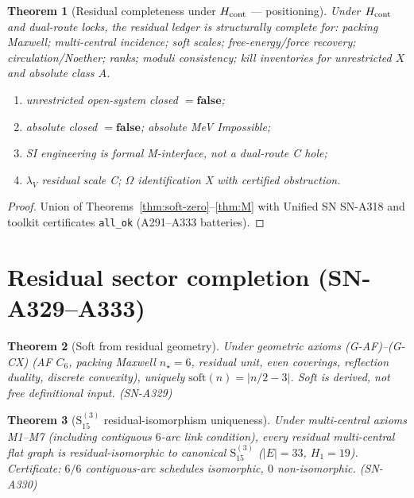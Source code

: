 \documentclass[11pt,a4paper]{article}
\newtheorem{theorem}{Theorem}
\theoremstyle{remark}
\begin{document}
\begin{theorem}[Residual completeness under $H_{\rm cont}$ --- positioning]
\label{thm:positioning}
Under $H_{\rm cont}$ and dual-route locks, the residual ledger is structurally complete for: packing Maxwell; multi-central incidence; soft scales; free-energy/force recovery; circulation/Noether; ranks; moduli consistency; kill inventories for unrestricted $X$ and absolute class $A$.
\begin{enumerate}[label=(\roman*)]
\item unrestricted open-system closed $=\mathbf{false}$;
\item absolute closed $=\mathbf{false}$; absolute MeV Impossible;
\item SI engineering is formal M-interface, not a dual-route C hole;
\item $\lambda_V$ residual scale C; $\Omega$ identification X with certified obstruction.
\end{enumerate}
\end{theorem}

\begin{proof}
Union of Theorems~\ref{thm:soft-zero}--\ref{thm:M} with Unified SN SN-A318 and toolkit certificates \texttt{all\_ok} (A291--A333 batteries).
\end{proof}


\section{Residual sector completion (SN-A329--A333)}
\label{sec:completion-A329}

\begin{theorem}[Soft from residual geometry]
Under geometric axioms (G-AF)--(G-CX) (AF $C_6$, packing Maxwell $n_\star=6$, residual unit, even coverings, reflection duality, discrete convexity), uniquely $\mathrm{soft}(n)=|n/2-3|$. Soft is derived, not free definitional input. (SN-A329)
\end{theorem}

\begin{theorem}[$\mathrm{S}_{15}^{(3)}$ residual-isomorphism uniqueness]
Under multi-central axioms M1--M7 (including contiguous $6$-arc link condition), every residual multi-central flat graph is residual-isomorphic to canonical $\mathrm{S}_{15}^{(3)}$ ($|E|=33$, $H_1=19$). Certificate: $6/6$ contiguous-arc schedules isomorphic, $0$ non-isomorphic. (SN-A330)
\end{theorem}
\end{document}
